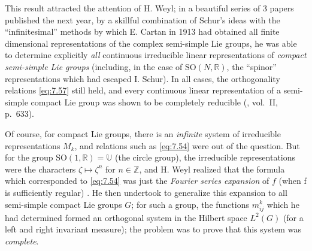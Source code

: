 \documentclass[12pt,a4paper,leqno,twoside]{extbook}
\newcommand{\R}{\mathbb{R}}
\begin{document}
This result attracted the attention of H. Weyl; in a beautiful series of 3 papers published the next year, by a skillful combination of Schur's ideas with the ``infinitesimal'' methods by which E. Cartan in 1913 had obtained all finite dimensional representations of the complex semi-simple Lie groups, he was able to determine explicitly \emph{all} continuous irreducible linear representations of \emph{compact semi-simple Lie groups} (including, in the case of \(\text{SO}(N,\R)\), the ``spinor'' representations which had escaped I. Schur). In all cases, the orthogonality relations \eqref{eq:7.57} still held, and every continuous linear representation of a semi-simple compact Lie group was shown to be completely reducible (\cite{227}, vol.~II, p.~633).

Of course, for compact Lie groups, there is an \emph{infinite} system of irreducible representations \(M_k\), and relations such as \eqref{eq:7.54} were out of the question. But for the group \(\text{SO}(1,\R) = \mathbb{U}\) (the circle group), the irreducible representations were the characters \(\zeta \mapsto \zeta^n\) for \(n \in \mathbb{Z}\), and H. Weyl realized that the formula which corresponded to \eqref{eq:7.54} was just the \emph{Fourier series expansion} of \(f\) (when f is sufficiently regular) \cite[vol.~III, p.~34--37]{227}. He then undertook to generalize this expansion to all semi-simple compact Lie groups \(G\); for such a group, the functions \(m^k_{ij}\) which he had determined formed an orthogonal system in the Hilbert space \(L^2(G)\) (for a left and right invariant measure); the problem was to prove that this system was \emph{complete}.
\end{document}
